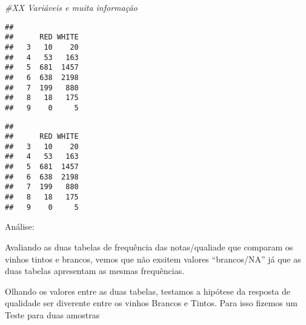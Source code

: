 \documentclass[]{article}
\newenvironment{Shaded}{\begin{snugshade}}{\end{snugshade}}
\newcommand{\KeywordTok}[1]{\textcolor[rgb]{0.13,0.29,0.53}{\textbf{#1}}}
\newcommand{\DataTypeTok}[1]{\textcolor[rgb]{0.13,0.29,0.53}{#1}}
\newcommand{\StringTok}[1]{\textcolor[rgb]{0.31,0.60,0.02}{#1}}
\newcommand{\CommentTok}[1]{\textcolor[rgb]{0.56,0.35,0.01}{\textit{#1}}}
\newcommand{\OperatorTok}[1]{\textcolor[rgb]{0.81,0.36,0.00}{\textbf{#1}}}
\newcommand{\NormalTok}[1]{#1}
\begin{document}
\begin{Shaded}
\begin{Highlighting}[]
\CommentTok{#XX Variáveis e muita informação}
\end{Highlighting}
\end{Shaded}

\begin{Shaded}
\end{Shaded}

\begin{verbatim}
##    
##      RED WHITE
##   3   10    20
##   4   53   163
##   5  681  1457
##   6  638  2198
##   7  199   880
##   8   18   175
##   9    0     5
\end{verbatim}

\begin{Shaded}
\end{Shaded}

\begin{verbatim}
##    
##      RED WHITE
##   3   10    20
##   4   53   163
##   5  681  1457
##   6  638  2198
##   7  199   880
##   8   18   175
##   9    0     5
\end{verbatim}

Análise:

Avaliando as duas tabelas de frequência das notas/qualiade que comparam
os vinhos tintos e brancos, vemos que não exsitem valores ``brancos/NA''
já que as duas tabelas apresentam as mesmas frequências.

Olhando os valores entre as duas tabelas, testamos a hipótese da
resposta de qualidade ser diverente entre os vinhos Brancos e Tintos.
Para isso fizemos um Teste para duas amostras

\begin{Shaded}
\end{Shaded}
\end{document}

